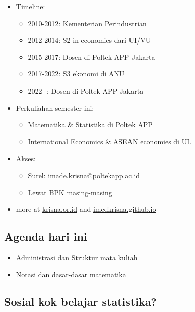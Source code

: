 \documentclass[
  letterpaper,
  DIV=11,
  numbers=noendperiod]{scrartcl}
\begin{document}
\begin{itemize}
\item
  Timeline:

  \begin{itemize}
  \item
    2010-2012: Kementerian Perindustrian
  \item
    2012-2014: S2 in economics dari UI/VU
  \item
    2015-2017: Dosen di Poltek APP Jakarta
  \item
    2017-2022: S3 ekonomi di ANU
  \item
    2022- : Dosen di Poltek APP Jakarta
  \end{itemize}
\item
  Perkuliahan semester ini:

  \begin{itemize}
  \item
    Matematika \& Statistika di Poltek APP
  \item
    International Economics \& ASEAN economies di UI.
  \end{itemize}
\item
  Akses:

  \begin{itemize}
  \item
    Surel: imade.krisna@poltekapp.ac.id
  \item
    Lewat BPK masing-masing
  \end{itemize}
\item
  more at \href{https://krisna.or.id}{krisna.or.id} and
  \href{https://imedkrisna.github.io/}{imedkrisna.github.io}
\end{itemize}

\subsection{Agenda hari ini}\label{agenda-hari-ini}

\begin{itemize}
\item
  Administrasi dan Struktur mata kuliah
\item
  Notasi dan dasar-dasar matematika
\end{itemize}

\subsection{Sosial kok belajar
statistika?}\label{sosial-kok-belajar-statistika}
\end{document}
